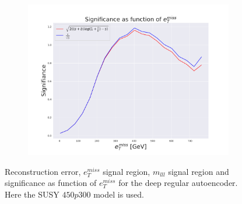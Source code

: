 \begin{figure}[H]
    \hfill 
    \begin{subfigure}{.40\textwidth}
        \includegraphics[width=\textwidth]{Figures/VAE_testing/big/2lep/significance_etmiss_450p0p0300_-0.6091405575830948.pdf}
        \caption{}
        \label{fig:VAE_2lep_big_signi_450_2}
    \end{subfigure}
    \hfill      
    \caption[2lep deep network | $450p300$ | VAE | 2]{Reconstruction error, $e_T^{miss}$ signal region, $m_{lll}$ signal region and significance as function of 
    $e_T^{miss}$ for the deep regular autoencoder. Here the SUSY $450p300$ model is used.}
    \label{fig:VAE_2lep_big_rec_sig_signi_450_2}
\end{figure}

